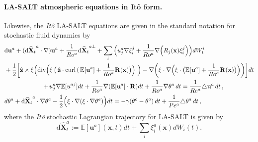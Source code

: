 \documentclass[11pt, oneside]{article}   	%
\numberwithin{equation}{section}
\theoremstyle{plain}
\theoremstyle{definition}
\theoremstyle{remark}
\newcommand{\<}{\langle}
\renewcommand{\>}{\rangle}
\def\rmd{{\mathrm{d}}}
\newcommand{\wh}[1]{\widehat{#1}}
\newcommand{\bs}[1]{\boldsymbol{#1}}
\begin{document}
\paragraph{LA-SALT atmospheric equations in It\^o form.}
Likewise, the \emph{It\^o} LA-SALT equations are
given in the standard notation for stochastic fluid dynamics by
%
\begin{align}
& \rmd\mathbf{u}^{a}+({\rmd\mathbf{\wh{X}}_{t}}^{a}\cdot \nabla )\mathbf{u}%
^{a}+\frac{1}{Ro^{a}}{\rmd\mathbf{\wh{X}}_{t}}^{a\bot }
 + {
\sum_{i}\Big(u_{j}^{a}\nabla \xi _{i}^{j}+\frac{1}{Ro^{a}}\nabla \Big(R_{j}%
\mathbf{(x})\xi _{i}^{j}\Big)\Big) dW_{t}^{i}}  \nonumber \\
&+\frac12 \bigg[ \mathbf{\hat{z}}\times \xi \Big( {\rm div}\Big(\xi\,\big(\,\mathbf{\hat{z}}\cdot{\rm curl}\,(\,\mathbb{E}[{\mathbf{u}}^{a}] + \frac{1}{Ro^{a}}\mathbf{R}(\mathbf{x}) \big)\Big) \,\,\Big)  
- \nabla \bigg( \xi\cdot\nabla\Big(\xi \cdot\big(\mathbb{E}[{\mathbf{u}}^{a}] + \frac{1}{Ro^{a}}\mathbf{R}(\mathbf{x})\big) \Big)
\bigg)\bigg]dt
\nonumber \\& \hspace{22mm}{+\,u_{j}^{a}\nabla \mathbb{E}[{u^{a}}^{j}]dt+%
\frac{1}{Ro^{a}}\nabla (\mathbb{E}[{\mathbf{u}}^{a}]\cdot \mathbf{R})dt}+%
\frac{1}{Ro^{a}}\nabla \theta ^{a}\,dt = \frac{1}{Re^{a}}\triangle \mathbf{u}^{a}\,dt\,,
\label{COUPLED_SWE_VELOC_A_STOCH_LA-Ito-Intro} \\
& d\theta ^{a}+{\rmd\mathbf{\wh{X}}_{t}}^{a}\cdot \nabla \theta
^{a} - \frac12 \Big(\xi\cdot\nabla(\xi\cdot\nabla \theta^a)  \Big)dt 
=-\gamma (\theta ^{o}-\theta ^{a})\,dt +  \frac{1}{Pe^{a}}\triangle \theta ^{a}\,dt
\,,
\label{COUPLED_SWE_T_A_STOCH_LA-Ito-Intro}
\end{align}
where the \emph{It\^o} stochastic Lagrangian trajectory for LA-SALT is given by
% 
\begin{equation}
{{\rmd}\mathbf{\wh{X}}_{t}^{a}} 
:= {\mathbb{E}[\mathbf{u}^{a}]}(\bs{x},t)dt + \sum_{i}\xi _{i}^{a}(\bs{x})dW_{i}(t).
\label{Lag-path-Ito}
\end{equation}
%
\end{document}
